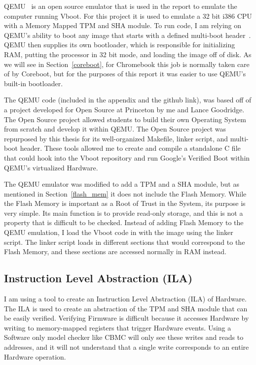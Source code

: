 \documentclass[../report.tex]{subfiles}
\begin{document}
QEMU~\cite{qemu-site} is an open source emulator that is used in the report to emulate the computer running Vboot.
For this project it is used to emulate a 32 bit i386 CPU with a Memory Mapped TPM and SHA module.
To run code, I am relying on QEMU's ability to boot any image that starts with a defined multi-boot header~\cite{multiboot}.
QEMU then supplies its own bootloader, which is responsible for initializing RAM, putting the processor in 32 bit mode, and loading the image off of disk.
As we will see in Section~\ref{coreboot}, for Chromebook this job is normally taken care of by Coreboot, but for the purposes of this report it was easier to use QEMU's built-in bootloader.

The QEMU code (included in the appendix and the github link), was based off of a project developed for Open Source at Princeton by me and Lance Goodridge.
The Open Source project allowed students to build their own Operating System from scratch and develop it within QEMU\@.
The Open Source project was repurposed by this thesis for its well-organized Makefile, linker script, and multi-boot header.
These tools allowed me to create and compile a standalone C file that could hook into the Vboot repository and run Google's Verified Boot within QEMU's virtualized Hardware.

The QEMU emulator was modified to add a TPM and a SHA module, but as mentioned in Section~\ref{flash_mem} it does not include the Flash Memory.
While the Flash Memory is important as a Root of Trust in the System, its purpose is very simple.
Its main function is to provide read-only storage, and this is not a property that is difficult to be checked.
Instead of adding Flash Memory to the QEMU emulation, I load the Vboot code in with the image using the linker script. %
The linker script loads in different sections that would correspond to the Flash Memory, and these sections are accessed normally in RAM instead.


\subsection{Instruction Level Abstraction (ILA)}

I am using a tool to create an Instruction Level Abstraction (ILA) of Hardware.
The ILA is used to create an abstraction of the TPM and SHA module that can be
easily verified.
Verifying Firmware is difficult because it accesses Hardware by writing to
memory-mapped registers that trigger Hardware events.
Using a Software only model checker like CBMC will only see these writes
and reads to addresses, and it will not understand that a single write
corresponds to an entire Hardware operation.
\end{document}
